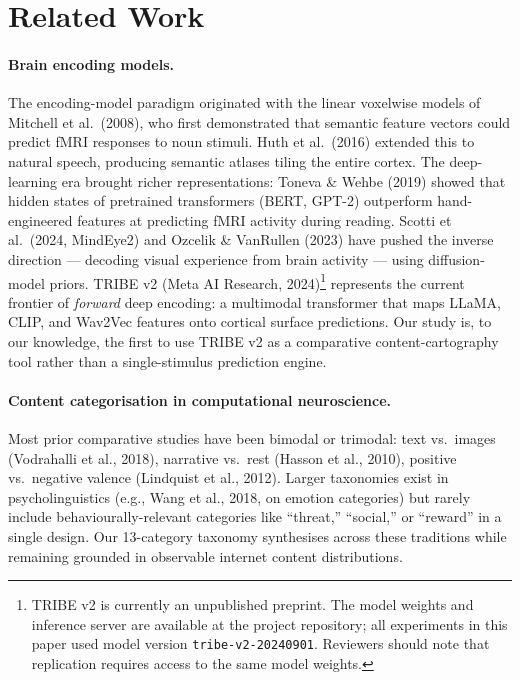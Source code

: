 \documentclass[11pt,letterpaper]{article}
\begin{document}
\section{Related Work}

\paragraph{Brain encoding models.} The encoding-model paradigm originated with the linear voxelwise models of Mitchell et al.\ (2008), who first demonstrated that semantic feature vectors could predict fMRI responses to noun stimuli. Huth et al.\ (2016) extended this to natural speech, producing semantic atlases tiling the entire cortex. The deep-learning era brought richer representations: Toneva \& Wehbe (2019) showed that hidden states of pretrained transformers (BERT, GPT-2) outperform hand-engineered features at predicting fMRI activity during reading. Scotti et al.\ (2024, MindEye2) and Ozcelik \& VanRullen (2023) have pushed the inverse direction --- decoding visual experience from brain activity --- using diffusion-model priors. TRIBE v2 (Meta AI Research, 2024)\footnote{TRIBE v2 is currently an unpublished preprint. The model weights and inference server are available at the project repository; all experiments in this paper used model version \texttt{tribe-v2-20240901}. Reviewers should note that replication requires access to the same model weights.} represents the current frontier of \textit{forward} deep encoding: a multimodal transformer that maps LLaMA, CLIP, and Wav2Vec features onto cortical surface predictions. Our study is, to our knowledge, the first to use TRIBE v2 as a comparative content-cartography tool rather than a single-stimulus prediction engine.

\paragraph{Content categorisation in computational neuroscience.} Most prior comparative studies have been bimodal or trimodal: text vs.\ images (Vodrahalli et al., 2018), narrative vs.\ rest (Hasson et al., 2010), positive vs.\ negative valence (Lindquist et al., 2012). Larger taxonomies exist in psycholinguistics (e.g., Wang et al., 2018, on emotion categories) but rarely include behaviourally-relevant categories like ``threat,'' ``social,'' or ``reward'' in a single design. Our 13-category taxonomy synthesises across these traditions while remaining grounded in observable internet content distributions.
\end{document}

